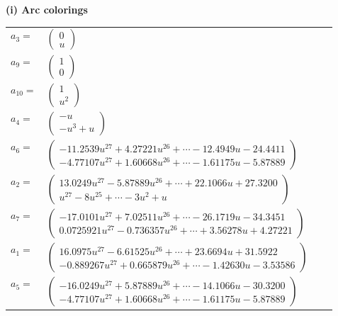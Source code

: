 \documentclass[1p]{elsarticle_modified}
\theoremstyle{definition}
\begin{document}
\flushleft \textbf{(i) Arc colorings}\\
\begin{tabular}{m{7pt} m{180pt} m{7pt} m{180pt} }
\flushright $a_{3}=$&$\begin{pmatrix}0\\u\end{pmatrix}$ \\
\flushright $a_{9}=$&$\begin{pmatrix}1\\0\end{pmatrix}$ \\
\flushright $a_{10}=$&$\begin{pmatrix}1\\u^2\end{pmatrix}$ \\
\flushright $a_{4}=$&$\begin{pmatrix}- u\\- u^3+u\end{pmatrix}$ \\
\flushright $a_{6}=$&$\begin{pmatrix}-11.2539 u^{27}+4.27221 u^{26}+\cdots-12.4949 u-24.4411\\-4.77107 u^{27}+1.60668 u^{26}+\cdots-1.61175 u-5.87889\end{pmatrix}$ \\
\flushright $a_{2}=$&$\begin{pmatrix}13.0249 u^{27}-5.87889 u^{26}+\cdots+22.1066 u+27.3200\\u^{27}-8 u^{25}+\cdots-3 u^2+u\end{pmatrix}$ \\
\flushright $a_{7}=$&$\begin{pmatrix}-17.0101 u^{27}+7.02511 u^{26}+\cdots-26.1719 u-34.3451\\0.0725921 u^{27}-0.736357 u^{26}+\cdots+3.56278 u+4.27221\end{pmatrix}$ \\
\flushright $a_{1}=$&$\begin{pmatrix}16.0975 u^{27}-6.61525 u^{26}+\cdots+23.6694 u+31.5922\\-0.889267 u^{27}+0.665879 u^{26}+\cdots-1.42630 u-3.53586\end{pmatrix}$ \\
\flushright $a_{5}=$&$\begin{pmatrix}-16.0249 u^{27}+5.87889 u^{26}+\cdots-14.1066 u-30.3200\\-4.77107 u^{27}+1.60668 u^{26}+\cdots-1.61175 u-5.87889\end{pmatrix}$ \\

\end{tabular}
\end{document}
